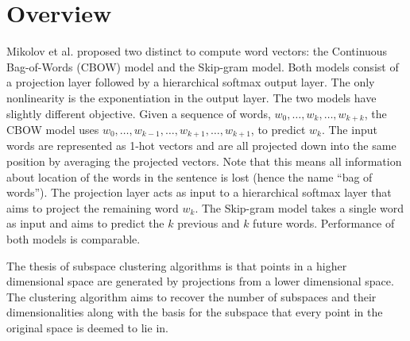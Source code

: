 \section{Overview}

Mikolov et al. proposed two distinct to compute word vectors: the Continuous Bag-of-Words (CBOW) model and the Skip-gram model. 
Both models consist of a projection layer followed by a hierarchical softmax output layer. 
The only nonlinearity is the exponentiation in the output layer. 
The two models have slightly different objective. 
Given a sequence of words, $w_0, \hdots , w_k, \hdots, w_{k+k}$, the CBOW model uses $w_0, \hdots, w_{k-1}, \hdots, w_{k+1}, \hdots, w_{k+1}$, to predict $w_k$. 
The input words are represented as 1-hot vectors and are all projected down into the same position by averaging the projected vectors. 
Note that this means all information about location of the words in the sentence is lost (hence the name “bag of words”). 
The projection layer acts as input to a hierarchical softmax layer that aims to project the remaining word $w_k$. 
The Skip-gram model takes a single word as input and aims to predict the $k$ previous and $k$ future words. 
Performance of both models is comparable.

	The thesis of subspace clustering algorithms is that points in a higher dimensional space are generated by projections from a lower dimensional space. The clustering algorithm aims to recover the number of subspaces and their dimensionalities along with the basis for the subspace that every point in the original space is deemed to lie in. 
